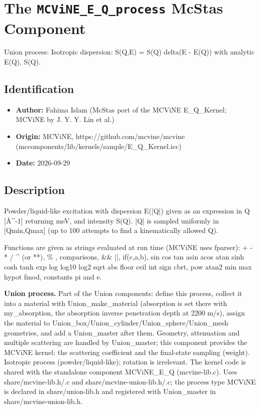 \section{The \texttt{MCViNE\_E\_Q\_process} McStas Component}
Union process: Isotropic dispersion: S(Q,E) = S(Q) delta(E - E(Q)) with analytic E(Q), S(Q).

\subsection*{Identification}
\begin{itemize}
  \item \textbf{Author:} Fahima Islam (McStas port of the MCViNE E\_Q\_Kernel; MCViNE by J. Y. Y. Lin et al.)
  \item \textbf{Origin:} MCViNE, https://github.com/mcvine/mcvine (mccomponents/lib/kernels/sample/E\_Q\_Kernel.icc)
  \item \textbf{Date:} 2026-09-29
\end{itemize}

\subsection*{Description}
Powder/liquid-like excitation with dispersion E(|Q|) given as an expression in Q [\AA{}\textasciicircum{}-1] returning meV, and intensity S(Q). |Q| is sampled uniformly in [Qmin,Qmax] (up to 100 attempts to find a kinematically allowed Q).

Functions are given as strings evaluated at run time (MCViNE uses fparser): + - * / \textasciicircum{} (or **), \% , comparisons, \&\& ||, if(c,a,b), sin cos tan asin acos atan sinh cosh tanh exp log log10 log2 sqrt abs floor ceil int sign cbrt, pow atan2 min max hypot fmod, constants pi and e.

\textbf{Union process.} Part of the Union components: define this process, collect it into a material with Union\_make\_material (absorption is set there with my\_absorption, the absorption inverse penetration depth at 2200 m/s), assign the material to Union\_box/Union\_cylinder/Union\_sphere/Union\_mesh geometries, and add a Union\_master after them. Geometry, attenuation and multiple scattering are handled by Union\_master; this component provides the MCViNE kernel: the scattering coefficient and the final-state sampling (weight). Isotropic process (powder/liquid-like); rotation is irrelevant. The kernel code is shared with the standalone component MCViNE\_E\_Q (mcvine-lib.c). Uses share/mcvine-lib.h/.c and share/mcvine-union-lib.h/.c; the process type MCViNE is declared in share/union-lib.h and registered with Union\_master in share/mcvine-union-lib.h.

